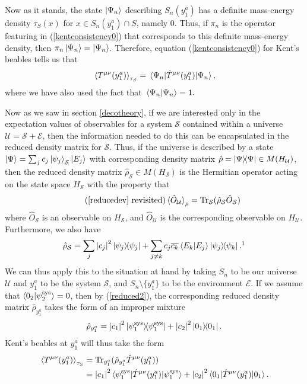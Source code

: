 Now as it stands, the state $\ket{\Psi_n}$ describing $S_n(y^a_1)$ has a definite mass-energy density $\tau_S(x)$ for $x\in S_n(y^a_1)\cap S$, namely $0$. Thus, if $\pi_n$ is the operator featuring in (\ref{kentconsistency0}) that corresponds to this definite mass-energy density, then $\pi_n\ket{\Psi_n}=\ket{\Psi_n}$. Therefore, equation (\ref{kentconsistency0}) for Kent's beables tells us that
$$\ev*{T^{\mu\nu}(y^a_1)}_{\tau_S}=\ev*{\hat{T}^{\mu\nu}(y^a_1)}{\Psi_n},$$ 
where we have also used the fact that $\ip*{\Psi_n}{\Psi_n}=1.$

Now as we saw in section \ref{decotheory}, if we are interested only in the expectation values of observables for a system $\mathcal{S}$ contained within a universe $\mathcal{U}=\mathcal{S}+\mathcal{E}$, then the information needed to do this can be encapsulated in the reduced density matrix for $\mathcal{S}$. Thus, if the universe is described by a state 
$\ket{\Psi}=\sum_j c_j \ket{\psi_j}_\mathcal{S}\ket{E_j}$ with corresponding density matrix $\hat{\rho}=\dyad{\Psi}\in M(H_\mathcal{U})$, then the reduced density matrix $\hat{\rho}_\mathcal{S}\in M(H_\mathcal{S})$ is the Hermitian operator acting on the state space $H_\mathcal{S}$ with the property that 
\begin{equation}\tag{\ref{reducedev} revisited}
\ev*{\hat{O}_\mathcal{U}}_\rho=\Tr_\mathcal{S}(\hat{\rho}_\mathcal{S}\hat{O}_\mathcal{S})
\end{equation}
where $\hat{O}_\mathcal{S}$ is an observable on $H_\mathcal{S}$,  and $\hat{O}_\mathcal{U}$ is the corresponding observable on $H_\mathcal{U}$. Furthermore, we also have
\begin{equation}\label{reduced2}
\hat{\rho}_\mathcal{S}=\sum_j \abs{c_j}^2\dyad{\psi_j}+\sum_{j\neq k} c_j\overline{c_k}\ip{E_k}{E_j}\dyad{\psi_j}{\psi_k}.\protect\footnotemark
\end{equation}
We can thus apply this to the situation at hand by taking $S_n$ to be our universe $\mathcal{U}$ and $y^a_1$ to be the system $\mathcal{S}$, and $S_n\setminus \{y^a_1\}$ to be the environment $\mathcal{E}$. If we assume that $\ip{0_2}{\psi_2^\text{sys}}= 0$, then by (\ref{reduced2}), the corresponding reduced density matrix $\hat{\rho}_{y^a_1}$ takes the form of an improper mixture
\begin{equation}\label{kentred}
\hat{\rho}_{y^a_1}= \abs{c_1}^2\dyad{\psi_1^\text{sys}}+\abs{c_2}^2\dyad{0_1}.
\end{equation}
Kent's beables at $y^a_1$ will thus take the form 
\begin{equation}\label{kentbe}
\begin{split}
\ev*{T^{\mu\nu}(y^a_1)}_{\tau_S}&=\Tr_{y^a_1}(\hat{\rho}_{y^a_1}\hat{T}^{\mu\nu}(y^a_1))\\
&=\abs{c_1}^2\ev*{\hat{T}^{\mu\nu}(y^a_1)}{\psi_1^\text{sys}}+\abs{c_2}^2\ev*{\hat{T}^{\mu\nu}(y^a_1)}{0_1}.
\end{split}
\end{equation}

